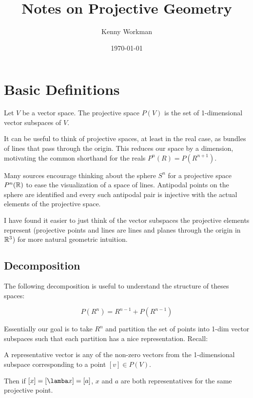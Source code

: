 \documentclass[10pt]{article}
\title{Notes on Projective Geometry}
\author{Kenny Workman}
\date{\today}
\begin{document}
\maketitle

\section{Basic Definitions}

\begin{definition}
	Let $V$ be a vector space. The projective space $P(V)$ is the set of 1-dimensional vector subspaces of $V$.
\end{definition}

It can be useful to think of projective spaces, at least in the real case, as
bundles of lines that pass through the origin. This reduces our space by a
dimension, motivating the common shorthand for the reals $P^n(R) = P(R^{n+1})$. 

Many sources encourage thinking about the sphere $S^n$ for a projective space
$P^n(\mathbb{R})$ to ease the visualization of a space of lines. Antipodal points on
the sphere are identified and every such antipodal pair is injective with the
actual elements of the projective space. 

I have found it easier to just think of the vector subspaces the projective
elements represent (projective points and lines are lines and planes through the
origin in $\mathbb{R}^3$) for more natural geometric intuition.

\subsection{Decomposition}

The following decomposition is useful to understand the structure of theses spaces:

\[P(R^n) = R^{n-1} + P(R^{n-1}) \]

Essentially our goal is to take $R^n$ and partition the set of points into
1-dim vector subspaces such that each partition has a nice representation.
Recall:

\begin{definition}
	A representative vector is any of the non-zero vectors from the 1-dimensional subspace corresponding to a point $[v] \in P(V)$.
\end{definition}

Then if $[x] = [\lamba x] = [a]$, $x$ and $a$ are both representatives for the same projective point.
\end{document}
